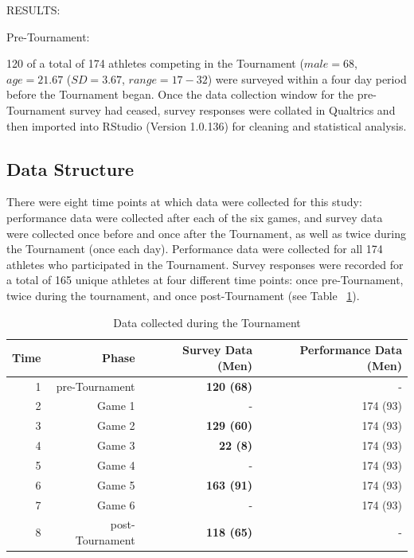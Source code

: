 RESULTS:

Pre-Tournament:

120 of a total of 174 athletes competing in the Tournament ($male = 68$, $age = 21.67$ ($SD = 3.67$, $range = 17-32$) were surveyed within a four day period before the Tournament began. Once the data collection window for the pre-Tournament survey had ceased, survey responses were collated in Qualtrics and then imported into RStudio (Version 1.0.136) for cleaning and statistical analysis. \\



\subsection{Data Structure}
There were eight time points at which data were collected for this study: performance data were collected after each of the six games, and survey data were collected once before and once after the Tournament, as well as twice during the Tournament (once each day). Performance data were collected for all 174 athletes who participated in the Tournament. Survey responses were recorded for a total of 165 unique athletes at four different time points: once pre-Tournament, twice during the tournament, and once post-Tournament (see Table ~\ref{tab:tournamentData}).

      \begin{table}[htbp]\caption{Data collected during the Tournament}
        \begin{center}
          \begin{small}
            \begin{tabular}{r r r r}
                Time & Phase & Survey Data (Men) & Performance Data (Men) \\
                \hline\hline
                1 & pre-Tournament & \bf 120 (68) & - \\
                2 & Game 1 & - & 174 (93) \\
                3 & Game 2 & \bf129 (60) & 174 (93) \\
                4 & Game 3 & \bf22 (8) & 174 (93) \\
                \hline
                5 & Game 4 & - & 174 (93) \\
                6 & Game 5 & \bf 163 (91) & 174 (93) \\
                7 & Game 6 & - & 174 (93) \\
                8 & post-Tournament & \bf118 (65) & - \\
                \hline
            \end{tabular}
          \end{small}
        \end{center}
        \label{tab:tournamentData}
      \end{table}

